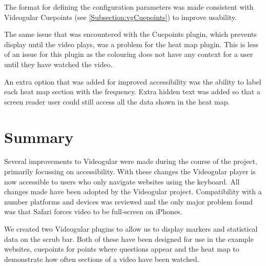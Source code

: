The format for defining the configuration parameters was made consistent with Videogular Cuepoints (see \autoref{Subsection:vgCuepoints}) to improve usability.

The same issue that was encountered with the Cuepoints plugin, which prevents display until the video plays, was a problem for the heat map plugin. This is less of an issue for this plugin as the colouring does not have any context for a user until they have watched the video.

An extra option that was added for improved accessibility was the ability to label each heat map section with the frequency. Extra hidden text was added so that a screen reader user could still access all the data shown in the heat map.

\section{Summary}

Several improvements to \gls{Videogular} were made during the course of the project, primarily focussing on accessibility. With these changes the \gls{Videogular} player is now accessible to users who only navigate websites using the keyboard. All changes made have been adopted by the \gls{Videogular} project. Compatibility with a number platforms and devices was reviewed and the only major problem found was that Safari forces video to be full-screen on iPhones.

We created two \gls{Videogular} plugins to allow us to display markers and statistical data on the \gls{scrub bar}. Both of these have been designed for use in the example websites, cuepoints for points where questions appear and the heat map to demonstrate how often sections of a video have been watched.


